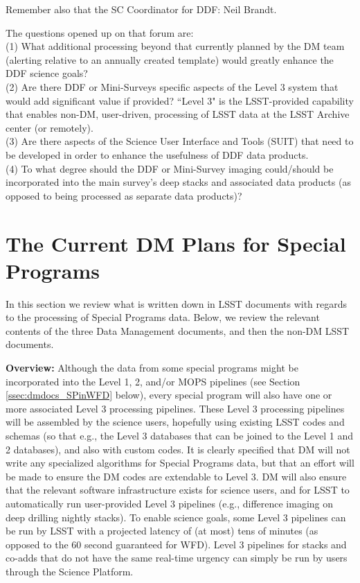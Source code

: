 \documentclass[DM,lsstdraft,toc]{lsstdoc}
\begin{document}
\noindent Remember also that the SC Coordinator for DDF: Neil Brandt.

\noindent The questions opened up on that forum are: \\
(1) What additional processing beyond that currently planned by the DM team (alerting relative to an annually created template) would greatly enhance the DDF science goals? \\
(2) Are there DDF or Mini-Surveys specific aspects of the Level 3 system that would add significant value if provided? ``Level 3" is the LSST-provided capability that enables non-DM, user-driven, processing of LSST data at the LSST Archive center (or remotely). \\
(3) Are there aspects of the Science User Interface and Tools (SUIT) that need to be developed in order to enhance the usefulness of DDF data products. \\
(4) To what degree should the DDF or Mini-Survey imaging could/should be incorporated into the main survey's deep stacks and associated data products (as opposed to being processed as separate data products)?



\clearpage
\section{The Current DM Plans for Special Programs} \label{sec:dmdocs}

In this section we review what is written down in LSST documents with regards to the processing of Special Programs data. Below, we review the relevant contents of the three Data Management documents, and then the non-DM LSST documents. 

\textbf{Overview:} Although the data from some special programs might be incorporated into the Level 1, 2, and/or MOPS pipelines (see Section \ref{ssec:dmdocs_SPinWFD} below), every special program will also have one or more associated Level 3 processing pipelines. These Level 3 processing pipelines will be assembled by the science users, hopefully using existing LSST codes and schemas (so that e.g., the Level 3 databases that can be joined to the Level 1 and 2 databases), and also with custom codes. It is clearly specified that DM will not write any specialized algorithms for Special Programs data, but that an effort will be made to ensure the DM codes are extendable to Level 3. DM will also ensure that the relevant software infrastructure exists for science users, and for LSST to automatically run user-provided Level 3 pipelines (e.g., difference imaging on deep drilling nightly stacks). To enable science goals, some Level 3 pipelines can be run by LSST with a projected latency of (at most) tens of minutes (as opposed to the 60 second guaranteed for WFD). Level 3 pipelines for stacks and co-adds that do not have the same real-time urgency can simply be run by users through the Science Platform. 
\end{document}
